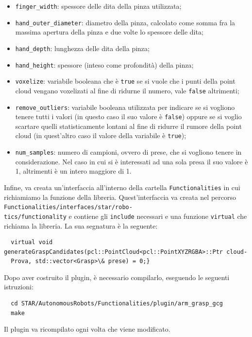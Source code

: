 \documentclass{report}
\begin{document}
\begin{itemize}
\item \texttt{finger\_width}: spessore delle dita della pinza utilizzata;
\item \texttt{hand\_outer\_diameter}: diametro della pinza, calcolato come somma fra la massima apertura della pinza e due volte lo spessore delle dita;
\item \texttt{hand\_depth}: lunghezza delle dita della pinza;
\item \texttt{hand\_height}: spessore (inteso come profondità) della pinza;
\item \texttt{voxelize}: variabile booleana che è \texttt{true} se si vuole che i punti della point cloud vengano voxelizati al fine di ridurne il numero, vale \texttt{false} altrimenti;
\item \texttt{remove\_outliers}: variabile booleana utilizzata per indicare se si vogliono tenere tutti i valori (in questo caso il suo valore è \texttt{false}) oppure se si voglio scartare quelli statisticamente lontani al fine di ridurre il rumore della point cloud (in quest'altro caso il valore della variabile è \texttt{true});
\item \texttt{num\_samples}: numero di campioni, ovvero di prese, che si vogliono tenere in considerazione. Nel caso in cui si è interessati ad una sola presa il suo valore è 1, altrimenti è un intero maggiore di 1.
\end{itemize}
Infine, va creata un'interfaccia all'interno della cartella \texttt{Functionalities} in cui richiamiamo la funzione della libreria. Quest'interfaccia va creata nel percorso \texttt{Functionalities/interfaces/star/robo-}\\\texttt{tics/functionality} e contiene gli \texttt{include} necessari e una funzione \texttt{virtual} che richiama la libreria. La sua segnatura è la seguente:
\begin{verbatim}
  virtual void generateGraspCandidates(pcl::PointCloud<pcl::PointXYZRGBA>::Ptr cloud-
  Prova, std::vector<Grasp>\& prese) = 0;}
\end{verbatim} 
Dopo aver costruito il plugin, è necessario compilarlo, eseguendo le seguenti istruzioni:
\begin{verbatim}
  cd STAR/AutonomousRobots/Functionalities/plugin/arm_grasp_gcg
  make
\end{verbatim} 
Il plugin va ricompilato ogni volta che viene modificato. 
\end{document}
